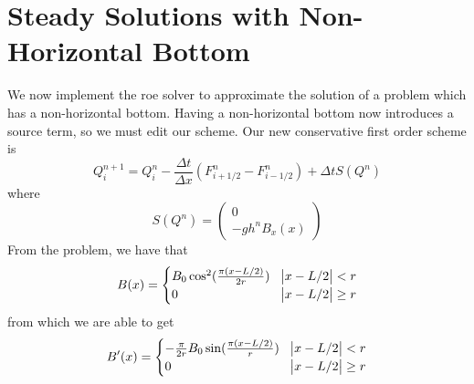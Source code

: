 \section{Steady Solutions with Non-Horizontal Bottom}
We now implement the roe solver to approximate the solution of a problem which has a non-horizontal bottom. Having a non-horizontal bottom now introduces a source term, so we must edit our scheme. Our new conservative first order scheme is 
$$Q_i^{n+1} = Q_i^n - \frac{\Delta t}{\Delta x}(F^n_{i+1/2}-F^n_{i-1/2})+\Delta t S(Q^n)$$ 
where 
$$S(Q^n)= \begin{pmatrix}
0 \\ -gh^n B_x(x)
\end{pmatrix}$$
From the problem, we have that
\[ B(x) = \begin{cases} 
      B_0 \cos^2(\frac{\pi(x-L/2)}{2r}) & \abs{x-L/2} < r \\
      0 & \abs{x-L/2} \geq r \\
   \end{cases}
\]
from which we are able to get 
\[ B'(x) = \begin{cases} 
      -\frac{\pi}{2r} B_0 \sin(\frac{\pi(x-L/2)}{r}) & \abs{x-L/2} < r \\
      0 & \abs{x-L/2} \geq r \\
   \end{cases}
\]
